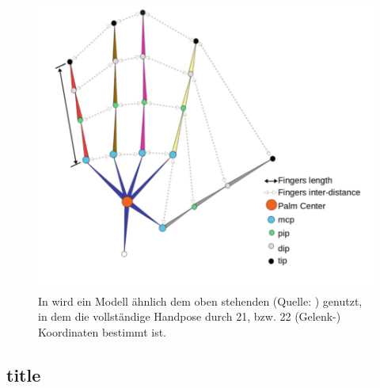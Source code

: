 	\begin{figure}
		\centering
		\includegraphics[width=0.7\linewidth]{Ressourcen/malik2018_hand_model}
		\caption[Handmodell nach \cite{Malik2018b}]{In \cite{Malik2018b} wird ein Modell ähnlich dem oben stehenden (Quelle: \cite{Malik2018b}) genutzt, in dem die vollständige Handpose durch 21, bzw. 22 (Gelenk-) Koordinaten bestimmt ist.}
		\label{fig:malik2018handmodel}
	\end{figure}
	
	
	\subsection{title}
	